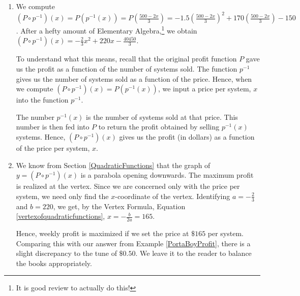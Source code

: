 \documentclass{ximera}
\begin{document}
\begin{example}
\begin{explanation}
\begin{enumerate}
\item  We compute $\left( P \circ p^{-1}\right)(x) = P \left(p^{-1}(x)\right) = P\left(\frac{500-2x}{3}\right) =  -1.5\left(\frac{500-2x}{3}\right)^2+170\left(\frac{500-2x}{3}\right)-150$. After a hefty amount of Elementary Algebra,\footnote{It is good review to actually do this!} we obtain $\left( P \circ p^{-1}\right)(x) = -\frac{2}{3} x^2 +220x - \frac{40450}{3}$.  

To understand what this means, recall that the original profit function $P$ gave us the profit as a function of the number of systems sold.  The function $p^{-1}$ gives us the number of systems sold as a function of the price.  Hence, when we compute $(P \circ p^{-1})(x) = P(p^{-1}(x))$, we input a price per system, $x$ into the function $p^{-1}$.  

The number $p^{-1}(x)$ is the number of systems sold at that price.  This number is then  fed into $P$ to return the  profit obtained by selling $p^{-1}(x)$ systems.  Hence, $\left(P \circ p^{-1}\right)(x)$ gives us the  profit (in dollars) as a function of the price per system, $x$.

\item  We know from Section \ref{QuadraticFunctions} that the graph of $y = \left( P \circ p^{-1}\right)(x)$ is a parabola opening downwards.  The maximum profit is realized at the vertex. Since we are concerned only with the price per system, we need only find the $x$-coordinate of the vertex.  Identifying $a = -\frac{2}{3}$ and $b = 220$, we get, by the Vertex Formula, Equation \ref{vertexofquadraticfunctions},  $x = -\frac{b}{2a} = 165$.  

Hence, weekly profit is maximized if we set the price at $\$165$ per system.  Comparing this with our answer from Example \ref{PortaBoyProfit}, there is a slight discrepancy to the tune of $\$0.50$.  We leave it to the reader to balance the books appropriately. 

\end{enumerate}
\end{explanation}
\end{example}



\closegraphsfile
\end{document}
